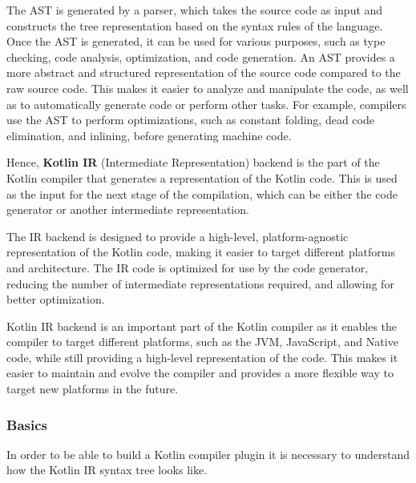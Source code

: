 The AST is generated by a parser, which takes the source code as input and constructs the tree representation based on the syntax rules of the language. Once the AST is generated, it can be used for various purposes, such as type checking, code analysis, optimization, and code generation.\newline
An AST provides a more abstract and structured representation of the source code compared to the raw source code. This makes it easier to analyze and manipulate the code, as well as to automatically generate code or perform other tasks. For example, compilers use the AST to perform optimizations, such as constant folding, dead code elimination, and inlining, before generating machine code.

Hence, \textbf{Kotlin IR} (Intermediate Representation) backend is the part of the Kotlin compiler that generates a representation of the Kotlin code. This is used as the input for the next stage of the compilation, which can be either the code generator or another intermediate representation.

The IR backend is designed to provide a high-level, platform-agnostic representation of the Kotlin code, making it easier to target different platforms and architecture. The IR code is optimized for use by the code generator, reducing the number of intermediate representations required, and allowing for better optimization.

Kotlin IR backend is an important part of the Kotlin compiler as it enables the compiler to target different platforms, such as the JVM, JavaScript, and Native code, while still providing a high-level representation of the code. This makes it easier to maintain and evolve the compiler and provides a more flexible way to target new platforms in the future.

\subsubsection{Basics}\label{section:compiler_plugin_basics}
In order to be able to build a Kotlin compiler plugin it is necessary to understand how the Kotlin IR syntax tree looks like.

